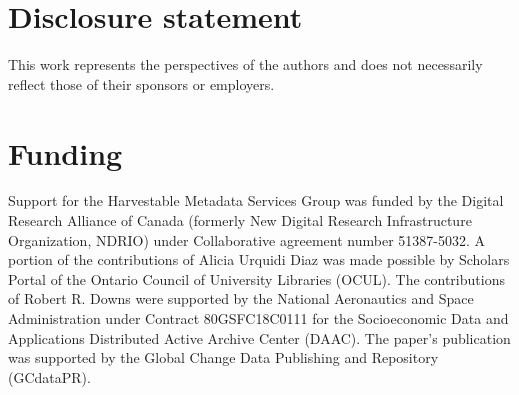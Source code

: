 \documentclass{interact}
\begin{document}
\section*{Disclosure statement}\label{disclosure-statement}
This work represents the perspectives of the authors and does not necessarily reflect those of their sponsors or employers.

\section*{Funding}\label{funding}

Support for the Harvestable Metadata Services Group was funded by the Digital Research Alliance of Canada (formerly New Digital Research Infrastructure Organization, NDRIO) under Collaborative agreement number 51387-5032. 
A portion of the contributions of Alicia Urquidi Diaz was made possible by Scholars Portal of the Ontario Council of University Libraries (OCUL).
The contributions of Robert R. Downs were supported by the National Aeronautics and Space Administration under Contract 80GSFC18C0111 for the Socioeconomic Data and Applications Distributed Active Archive Center (DAAC). 
The paper's publication was supported by the Global Change Data Publishing and Repository (GCdataPR).

\end{document}
